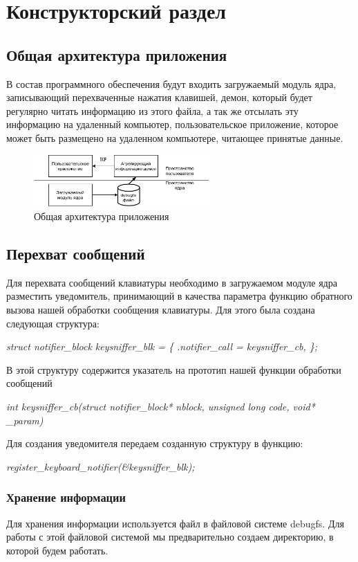 \chapter{Конструкторский раздел}
\label{cha:design}
\section{Общая архитектура приложения}
В состав программного обеспечения будут входить
загружаемый модуль ядра, записывающий перехваченные нажатия клавишей, демон, который будет регулярно читать информацию из этого файла, а так же отсылать эту информацию на удаленный компьютер, пользовательское приложение, которое может быть размещено на удаленном компьютере, читающее принятые данные.
\begin{figure}[h!]
	\centering
	\includegraphics[width=0.6\textwidth]{img/diagram1.png}
	\caption{Общая архитектура приложения}
	\label{fig:spire01}
\end{figure}
\section{Перехват сообщений}
Для перехвата сообщений клавиатуры необходимо в загружаемом модуле ядра разместить уведомитель, принимающий в качества параметра функцию обратного вызова нашей обработки сообщения клавиатуры.
Для этого была создана следующая структура:

\textit{	struct notifier\_block keysniffer\_blk = \{
		.notifier\_call = keysniffer\_cb,
	\};}

В этой структуру содержится указатель на прототип  нашей функции обработки сообщений

\textit{int keysniffer\_cb(struct notifier\_block* nblock,
unsigned long code,
void* \_param)}

Для создания уведомителя передаем созданную структуру в функцию:

\textit{	register\_keyboard\_notifier(\&keysniffer\_blk);}

\subsection{Хранение информации}
Для хранения информации используется файл в файловой системе debugfs. Для работы  с этой файловой системой мы предварительно создаем директорию, в которой будем работать.

